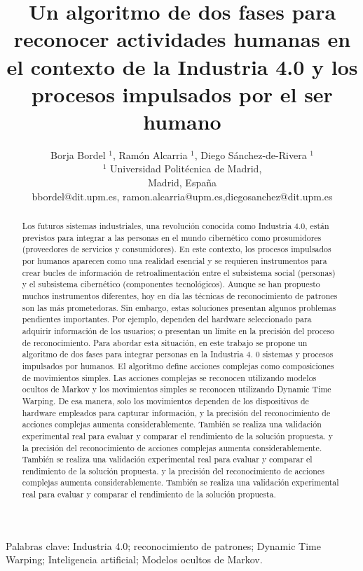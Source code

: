\documentclass[10pt]{article}
\title {\textbf{Un algoritmo de dos fases para reconocer actividades humanas en el contexto de la Industria 4.0 y los procesos impulsados por el ser humano }}
\author{Borja Bordel $^{1}$, Ramón Alcarria ${ }^{1}$, Diego Sánchez-de-Rivera ${ }^{1}$\\
${ }^{1}$ Universidad Politécnica de Madrid,\\
Madrid, España\\
bbordel@dit.upm.es, ramon.alcarria@upm.es,diegosanchez@dit.upm.es}
\date{}
\begin{document}
\maketitle


\begin{abstract}
 Los futuros sistemas industriales, una revolución conocida como Industria 4.0, están previstos para integrar a las personas en el mundo cibernético como prosumidores (proveedores de servicios y consumidores). En este contexto, los procesos impulsados por humanos aparecen como una realidad esencial y se requieren instrumentos para crear bucles de información de retroalimentación entre el subsistema social (personas) y el subsistema cibernético (componentes tecnológicos). Aunque se han propuesto muchos instrumentos diferentes, hoy en día las técnicas de reconocimiento de patrones son las más prometedoras. Sin embargo, estas soluciones presentan algunos problemas pendientes importantes. Por ejemplo, dependen del hardware seleccionado para adquirir información de los usuarios; o presentan un límite en la precisión del proceso de reconocimiento. Para abordar esta situación, en este trabajo se propone un algoritmo de dos fases para integrar personas en la Industria 4. 0 sistemas y procesos impulsados por humanos. El algoritmo define acciones complejas como composiciones de movimientos simples. Las acciones complejas se reconocen utilizando modelos ocultos de Markov y los movimientos simples se reconocen utilizando Dynamic Time Warping. De esa manera, solo los movimientos dependen de los dispositivos de hardware empleados para capturar información, y la precisión del reconocimiento de acciones complejas aumenta considerablemente. También se realiza una validación experimental real para evaluar y comparar el rendimiento de la solución propuesta. y la precisión del reconocimiento de acciones complejas aumenta considerablemente. También se realiza una validación experimental real para evaluar y comparar el rendimiento de la solución propuesta. y la precisión del reconocimiento de acciones complejas aumenta considerablemente. También se realiza una validación experimental real para evaluar y comparar el rendimiento de la solución propuesta. 

\end{abstract}

Palabras clave: Industria 4.0; reconocimiento de patrones; Dynamic Time Warping; Inteligencia artificial; Modelos ocultos de Markov.
\end{document}
